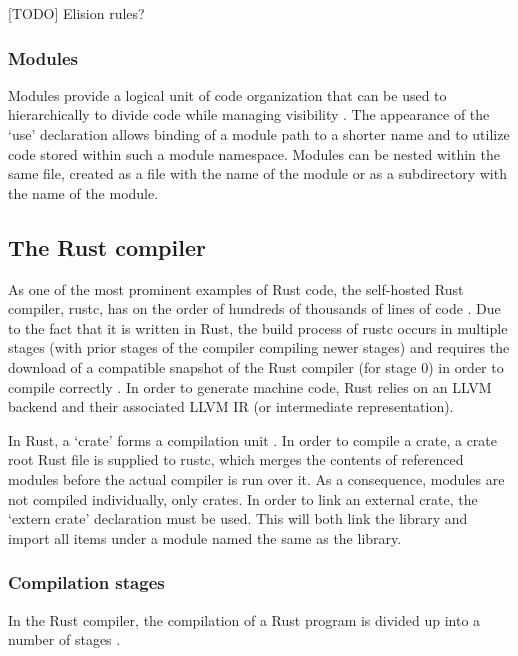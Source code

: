 [TODO] Elision rules?

\subsubsection{Modules}
Modules provide a logical unit of code organization that can be used to hierarchically to divide code while managing visibility \cite{docmod15}. The appearance of the `use' declaration allows binding of a module path to a shorter name and to utilize code stored within such a module namespace. Modules can be nested within the same file, created as a file with the name of the module or as a subdirectory with the name of the module.


\subsection{The Rust compiler}
As one of the most prominent examples of Rust code, the self-hosted Rust compiler, rustc, has on the order of hundreds of thousands of lines of code \cite{openhub15}. Due to the fact that it is written in Rust, the build process of rustc occurs in multiple stages (with prior stages of the compiler compiling newer stages) and requires the download of a compatible snapshot of the Rust compiler (for stage 0) in order to compile correctly \cite{makefile15}. In order to generate machine code, Rust relies on an LLVM backend and their associated LLVM IR (or intermediate representation).

In Rust, a `crate' forms a compilation unit \cite{examplecrates15}. In order to compile a crate, a crate root Rust file is supplied to rustc, which merges the contents of referenced modules before the actual compiler is run over it. As a consequence, modules are not compiled individually, only crates. In order to link an external crate, the `extern crate' declaration must be used. This will both link the library and import all items under a module named the same as the library. 

\subsubsection{Compilation stages}
In the Rust compiler, the compilation of a Rust program is divided up into a number of stages \cite{driver15}. 

